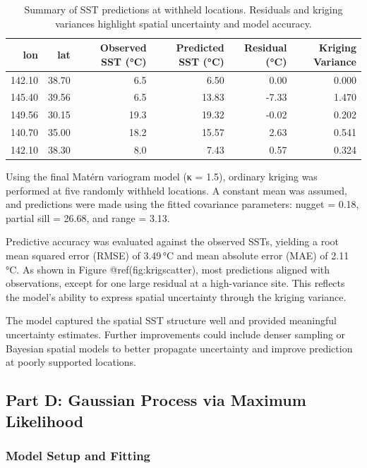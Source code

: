 \documentclass[
  11pt,
]{article}
\begin{document}
\begin{table}

\caption{Summary of SST predictions at withheld locations. Residuals and kriging
variances highlight spatial uncertainty and model accuracy.}
\centering
\begin{tabular}[t]{rrrrrr}
\toprule
lon & lat & Observed SST (°C) & Predicted SST (°C) & Residual (°C) & Kriging Variance\\
\midrule
142.10 & 38.70 & 6.5 & 6.50 & 0.00 & 0.000\\
145.40 & 39.56 & 6.5 & 13.83 & -7.33 & 1.470\\
149.56 & 30.15 & 19.3 & 19.32 & -0.02 & 0.202\\
140.70 & 35.00 & 18.2 & 15.57 & 2.63 & 0.541\\
142.10 & 38.30 & 8.0 & 7.43 & 0.57 & 0.324\\
\bottomrule
\end{tabular}
\end{table}

Using the final Matérn variogram model (κ = 1.5), ordinary kriging was
performed at five randomly withheld locations. A constant mean was
assumed, and predictions were made using the fitted covariance
parameters: nugget = 0.18, partial sill = 26.68, and range = 3.13.

Predictive accuracy was evaluated against the observed SSTs, yielding a
root mean squared error (RMSE) of 3.49\,°C and mean absolute error (MAE)
of 2.11\,°C. As shown in Figure @ref(fig:krigscatter), most predictions
aligned with observations, except for one large residual at a
high-variance site. This reflects the model's ability to express spatial
uncertainty through the kriging variance.

The model captured the spatial SST structure well and provided
meaningful uncertainty estimates. Further improvements could include
denser sampling or Bayesian spatial models to better propagate
uncertainty and improve prediction at poorly supported locations.

\subsection{Part D: Gaussian Process via Maximum
Likelihood}\label{part-d-gaussian-process-via-maximum-likelihood}

\subsubsection{Model Setup and Fitting}\label{model-setup-and-fitting}
\end{document}
